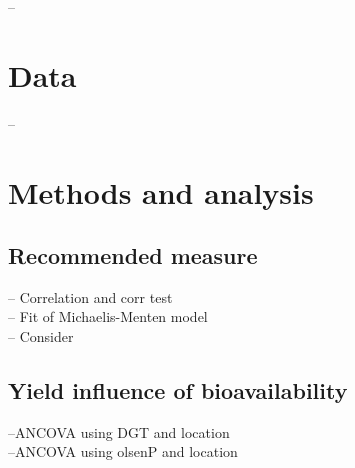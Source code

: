 \documentclass[12pt,fleqn]{article}
\title{}
\author{Asger Schultz}
\date{\today}
\begin{document}
\maketitle
-- 
\tableofcontents
\newpage 
\section{Data}
--


\section{Methods and analysis}
\subsection{Recommended measure}
-- Correlation and corr test\\
-- Fit of Michaelis-Menten model\\
-- Consider 
\subsection{Yield influence of bioavailability}
--ANCOVA using DGT and location\\
--ANCOVA using olsenP and location
\end{document}
